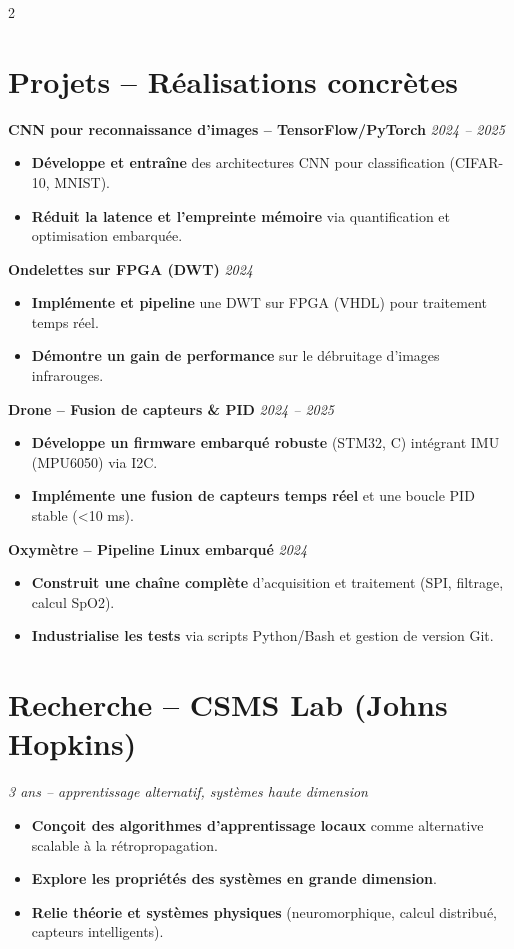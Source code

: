 \documentclass[10pt,a4paper]{article}
\begin{document}
\begin{multicols}{2}
\section*{Projets – Réalisations concrètes}
\textbf{CNN pour reconnaissance d’images – TensorFlow/PyTorch} \hfill \textit{2024 – 2025}
\begin{itemize}[leftmargin=*]
    \item \textbf{Développe et entraîne} des architectures CNN pour classification (CIFAR-10, MNIST).
    \item \textbf{Réduit la latence et l’empreinte mémoire} via quantification et optimisation embarquée.
\end{itemize}

\textbf{Ondelettes sur FPGA (DWT)} \hfill \textit{2024}
\begin{itemize}[leftmargin=*]
    \item \textbf{Implémente et pipeline} une DWT sur FPGA (VHDL) pour traitement temps réel.
    \item \textbf{Démontre un gain de performance} sur le débruitage d’images infrarouges.
\end{itemize}

\textbf{Drone – Fusion de capteurs \& PID} \hfill \textit{2024 – 2025}
\begin{itemize}[leftmargin=*]
    \item \textbf{Développe un firmware embarqué robuste} (STM32, C) intégrant IMU (MPU6050) via I2C.
    \item \textbf{Implémente une fusion de capteurs temps réel} et une boucle PID stable (<10 ms).
\end{itemize}

\textbf{Oxymètre – Pipeline Linux embarqué} \hfill \textit{2024}
\begin{itemize}[leftmargin=*]
    \item \textbf{Construit une chaîne complète} d’acquisition et traitement (SPI, filtrage, calcul SpO2).
    \item \textbf{Industrialise les tests} via scripts Python/Bash et gestion de version Git.
\end{itemize}

\section*{Recherche – CSMS Lab (Johns Hopkins)}
\textit{3 ans – apprentissage alternatif, systèmes haute dimension}
\begin{itemize}[leftmargin=*]
    \item \textbf{Conçoit des algorithmes d’apprentissage locaux} comme alternative scalable à la rétropropagation.
    \item \textbf{Explore les propriétés des systèmes en grande dimension}.
    \item \textbf{Relie théorie et systèmes physiques} (neuromorphique, calcul distribué, capteurs intelligents).
\end{itemize}

\end{multicols}
\end{document}
